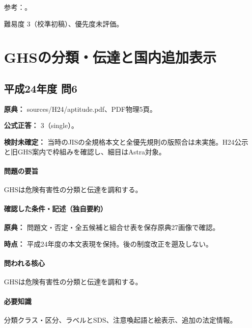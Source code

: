 \par 参考：\cite{saf53_food_roles2007,saf_fsc_psych,saf_fsc_glossary}。

\par 難易度 3（校準初稿）、優先度未評価。

\section{GHSの分類・伝達と国内追加表示}

\subsection{平成24年度 問6}
\label{q:h24-reg-apt-06}

\noindent\textbf{原典：} sources/H24/aptitude.pdf、PDF物理5頁。

\textbf{公式正答：} 3（single）。

\par\textbf{検討未確定：} 当時のJISの全規格本文と全優先規則の版照合は未実施。H24公示と旧GHS案内で枠組みを確認し、細目はAstra対象。

\paragraph{問題の要旨} GHSは危険有害性の分類と伝達を調和する。

\paragraph{確認した条件・記述（独自要約）}\mbox{}\par

\noindent\textbf{原典：} 問題文・否定・全五候補と組合せ表を保存原典27画像で確認。\par

\noindent\textbf{時点：} 平成24年度の本文表現を保持。後の制度改正を遡及しない。\par

\paragraph{問われる核心} GHSは危険有害性の分類と伝達を調和する。

\paragraph{必要知識} 分類クラス・区分、ラベルとSDS、注意喚起語と絵表示、追加の法定情報。

